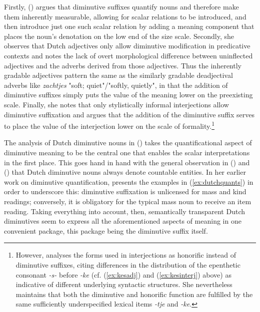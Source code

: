 Firstly, \citeauthor{DeBelder+2022} (\citeyear{DeBelder+2022}) argues that diminutive suffixes quantify nouns and therefore make them inherently measurable, allowing for scalar relations to be introduced, and then introduce just one such scalar relation by adding a meaning component that places the noun's denotation on the low end of the size scale. Secondly, she observes that Dutch adjectives only allow diminutive modification in predicative contexts and notes the lack of overt morphological difference between uninflected adjectives and the adverbs derived from those adjectives. Thus the inherently gradable adjectives pattern the same as the similarly gradable deadjectival adverbs like \textit{zachtjes} "soft; quiet"/"softly, quietly", in that the addition of diminutive suffixes simply puts the value of the meaning lower on the preexisting scale. Finally, she notes that only stylistically informal interjections allow diminutive suffixation and argues that the addition of the diminutive suffix serves to place the value of the interjection lower on the scale of formality.\footnote{However, \citeauthor{DeBelder+2022} analyses the forms used in interjections as honorific instead of diminutive suffixes, citing differences in the distribution of the epenthetic consonant \textit{-s-} before \textit{-ke} (cf. (\ref{ex:kesadj}) and (\ref{ex:kesinterj}) above) as indicative of different underlying syntactic structures. She nevertheless maintains that both the diminutive and honorific function are fulfilled by the same sufficiently underspecified lexical items \textit{-tje} and \textit{-ke}.} 

The analysis of Dutch diminutive nouns in \citeauthor{DeBelder+2022} (\citeyear{DeBelder+2022}) takes the quantificational aspect of diminutive meaning to be the central one that enables the scalar interpretations in the first place. This goes hand in hand with the general observation in \citeauthor{Wiltschko+2006} (\citeyear{Wiltschko+2006}) and \citeauthor{taalportaal} (\citeyear{taalportaal}) that Dutch diminutive nouns always denote countable entities. In her earlier work on diminutive quantification, \citeauthor{DeBelder+2008} \citeyear{DeBelder+2008} presents the examples in (\ref{ex:dutchquants}) in order to underscore this: diminutive suffixation is unlicensed for mass and kind readings; conversely, it is obligatory for the typical mass noun to receive an item reading. Taking everything into account, then, semantically transparent Dutch diminutives seem to express all the aforementioned aspects of meaning in one convenient package, this package being the diminutive suffix itself. 

